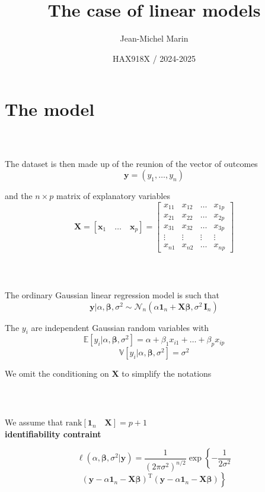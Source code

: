 \documentclass[notes,professionalfont,11pt,usenames,dvipsnames]{beamer}
\title[Linear models]{The case of linear models}
\author[Jean-Michel Marin]{Jean-Michel Marin}
\institute[IMAG]{University of Montpellier \\
Faculty of Sciences}
\date[HAX918X]{HAX918X / 2024-2025}
\renewcommand{\mathcal}{\mathscr}
\newcommand{\by}{\mathbf{y}}
\newcommand{\bx}{\mathbf{x}}
\newcommand{\bX}{\mathbf{X}}
\newcommand{\bbeta}{\boldsymbol{\beta}}
\renewcommand{\mathcal}{\mathscr}
\newcommand\justify{\rightskip0pt \leftskip0pt}
\newenvironment{slide}
{\begin{frame}[environment=slide]
\frametitle{\insertsection \\ \insertsubsection}\justify\setlength{\parskip}{0.5cm}\vspace{-0.5cm}}
{\end{frame}}
\begin{document}
\frame{\titlepage}

\frame{\tableofcontents} 

\section{The model}

\begin{slide}

The dataset is then made up of the reunion of the vector of outcomes
$$
\by=\left(y_1,\ldots,y_n\right)
$$


and the $n\times p$ matrix of explanatory variables
$$
\bX=\left[\bx_1 \quad \ldots\quad \bx_p\right]=\left[\begin{array}{ccccc}
 x_{11} & x_{12} & \ldots & x_{1p} \\
 x_{21} & x_{22} & \ldots & x_{2p} \\
 x_{31} & x_{32} & \ldots & x_{3p} \\
 \vdots & \vdots & \vdots & \vdots \\
 x_{n1} & x_{n2} & \ldots & x_{np}
\end{array}\right] 
$$

\end{slide}

\begin{slide}

The ordinary Gaussian linear regression model is such that
$$
\by|\alpha,\bbeta,\sigma^2
\sim\mathcal{N}_n\left(\alpha\mathbf{1}_n+\bX \bbeta,\sigma^2\,\mathbf{I}_n\right)
$$

The $y_i$ are independent Gaussian random variables with
$$
\mathbb{E}[y_i|\alpha,\bbeta,\sigma^2]=\alpha+\beta_1
x_{i1}+\ldots+\beta_p x_{ip}
$$
$$
\mathbb{V}[y_i|\alpha,\bbeta,\sigma^2]=\sigma^2
$$

We omit the conditioning on $\bX$ to simplify the notations

\end{slide}

\begin{slide}

We assume that $\mbox{rank}\left[\mathbf{1}_n \quad \bX\right]=p+1$ \\
{\bf \color{red} identifiability contraint}
 
$$
\ell(\alpha,\bbeta,\sigma^2|\by)=\frac{1}{\left(2\pi\sigma^2\right)^{n/2}} \exp\left\{-\frac{1}{2\sigma^2}\right.
$$
$$
\left.\left(\by-\alpha\mathbf{1}_n-\bX\bbeta\right)^\text{T}\left(\by-\alpha\mathbf{1}_n-\bX\bbeta\right)\right\}
$$

\end{slide}
\end{document}
